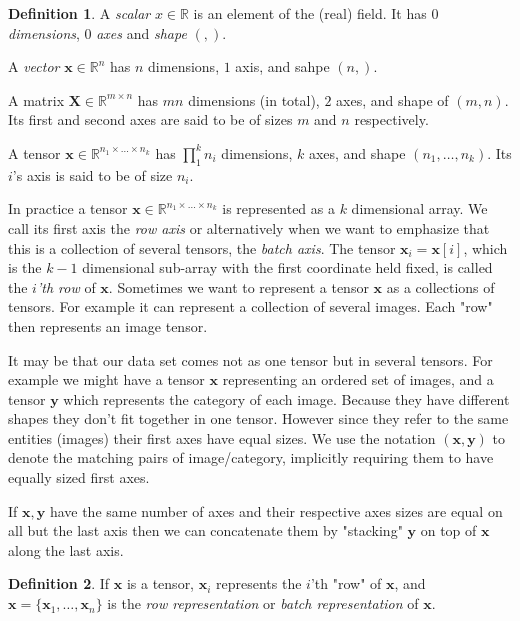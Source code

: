 \documentclass[11pt, a4paper]{report}
\theoremstyle{plain}
\theoremstyle{definition}
\newtheorem{mydef}{Definition}[chapter]
\theoremstyle{remark}
\newcommand{\R}{\mathbb{R}}
\newcommand{\X}{\mathbf{X}}
\newcommand{\x}{\mathbf{x}}
\newcommand{\y}{\mathbf{y}}
\begin{document}
\begin{mydef}
\label{def:tensor}
A \emph{scalar} $x \in \R$ is an element of the (real) field.
It has $0$ \emph{dimensions}, $0$ \emph{axes} and \emph{shape} $(,)$.

A \emph{vector} $\x \in \R^n$ has $n$ dimensions, $1$ axis, and sahpe $(n,)$.

A matrix $\X \in \R^{m \times n}$ has $mn$ dimensions (in total), $2$ axes, and shape of $(m,n)$.
Its first and second axes are said to be of sizes $m$ and $n$ respectively.

A tensor $\x \in \R^{n_1 \times \dots \times n_k}$
has $\prod_1^k n_i$ dimensions, $k$ axes, and shape $(n_1, \dots, n_k)$.
Its $i$'s axis is said to be of size $n_i$.
\end{mydef}

In practice a tensor $\x \in \R^{n_1 \times \dots \times n_k}$
is represented as a $k$ dimensional array.
We call its first axis the \emph{row axis} or alternatively when we
want to emphasize that this is a collection of several tensors, the \emph{batch
axis}.
The tensor $\x_i = \x[i]$, which is the $k-1$ dimensional sub-array with the first
coordinate held fixed, is called the \emph{$i$'th row} of $\x$.
Sometimes we want to represent a tensor $\x$ as a collections of tensors. For
example it can represent a collection of several images. Each "row" then
represents an image tensor.

It may be that our data set comes not as one tensor but in several tensors.
For example we might have a tensor $\x$ representing an ordered set of images,
and a tensor $\y$ which represents the category of each image.
Because they have different shapes they don't fit together in one tensor.
However since they refer to the same entities (images) their first axes have equal
sizes. We use the notation $(\x, \y)$ to denote the matching pairs of
image/category, implicitly requiring them to have equally sized first axes.

If $\x,\y$ have the same number of axes and their respective axes sizes are equal
on all but the last axis then we can concatenate them by "stacking" $\y$ on top
of $\x$ along the last axis.

\begin{mydef}
\label{def:rowrep}
If $\x$ is a tensor, $\x_i$ represents the $i$'th "row" of $\x$,
and $\x = \{\x_1, \dots , \x_n\}$ is the \emph{row representation} or 
\emph{batch
representation} of $\x$.
\end{mydef}
\end{document}
